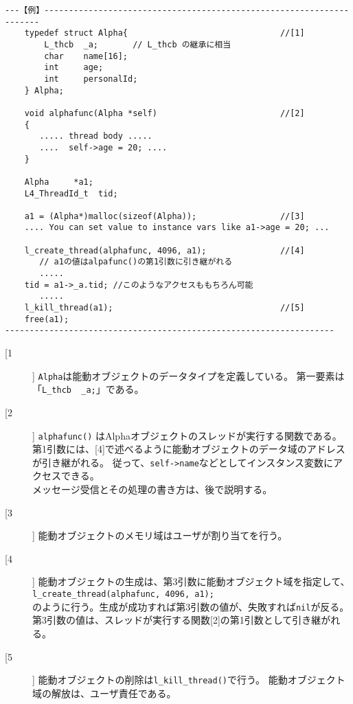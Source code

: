 \begin{verbatim}
---【例】---------------------------------------------------------------------
    typedef struct Alpha{                               //[1]
        L_thcb  _a;       // L_thcb の継承に相当
        char    name[16];
        int     age;
        int     personalId;
    } Alpha;

    void alphafunc(Alpha *self)                         //[2]
    {
       ..... thread body .....
       ....  self->age = 20; ....
    }

    Alpha     *a1;
    L4_ThreadId_t  tid;

    a1 = (Alpha*)malloc(sizeof(Alpha));                 //[3]
    .... You can set value to instance vars like a1->age = 20; ...

    l_create_thread(alphafunc, 4096, a1);               //[4]
       // a1の値はalpafunc()の第1引数に引き継がれる
       .....
    tid = a1->_a.tid; //このようなアクセスももちろん可能
       .....
    l_kill_thread(a1);                                  //[5]
    free(a1);
-------------------------------------------------------------------
\end{verbatim}

\begin{description}
\item[[1]]
  \verb|Alpha|は能動オブジェクトのデータタイプを定義している。
  第一要素は「\verb|L_thcb  _a;|」である。　

\item[[2]]
  \verb|alphafunc()| はAlphaオブジェクトのスレッドが実行する関数である。
  第1引数には、[4]で述べるように能動オブジェクトのデータ域のアドレスが引き継がれる。
  従って、\verb|self->name|などとしてインスタンス変数にアクセスできる。\\
  メッセージ受信とその処理の書き方は、後で説明する。

\item[[3]]  能動オブジェクトのメモリ域はユーザが割り当てを行う。

\item[[4]]  能動オブジェクトの生成は、第3引数に能動オブジェクト域を指定して、\\
  \verb|l_create_thread(alphafunc, 4096, a1);| \\
  のように行う。生成が成功すれば第3引数の値が、失敗すれば\verb|nil|が反る。
  第3引数の値は、スレッドが実行する関数[2]の第1引数として引き継がれる。

\item[[5]]  能動オブジェクトの削除は\verb|l_kill_thread()|で行う。
  能動オブジェクト域の解放は、ユーザ責任である。

\end{description}

